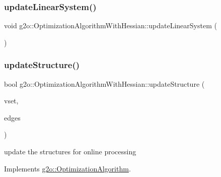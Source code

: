 \subsubsection{\texorpdfstring{update\+Linear\+System()}{updateLinearSystem()}}
{\footnotesize\ttfamily void g2o\+::\+Optimization\+Algorithm\+With\+Hessian\+::update\+Linear\+System (\begin{DoxyParamCaption}{ }\end{DoxyParamCaption})\hspace{0.3cm}{\ttfamily [virtual]}}

\mbox{\label{classg2o_1_1_optimization_algorithm_with_hessian_adadb23f135e037ce760f4415a0f26269}} 
\subsubsection{\texorpdfstring{update\+Structure()}{updateStructure()}}
{\footnotesize\ttfamily bool g2o\+::\+Optimization\+Algorithm\+With\+Hessian\+::update\+Structure (\begin{DoxyParamCaption}\item[{const std\+::vector$<$ \mbox{\hyperlink{classg2o_1_1_hyper_graph_1_1_vertex}{Hyper\+Graph\+::\+Vertex}} $\ast$$>$ \&}]{vset,  }\item[{const \mbox{\hyperlink{classg2o_1_1_hyper_graph_a5e2970e236c0dcb4eff7c205d7b6b4ae}{Hyper\+Graph\+::\+Edge\+Set}} \&}]{edges }\end{DoxyParamCaption})\hspace{0.3cm}{\ttfamily [virtual]}}

update the structures for online processing 

Implements \mbox{\hyperlink{classg2o_1_1_optimization_algorithm_a350d9bb4ee701e40b75e67d26293a4bd}{g2o\+::\+Optimization\+Algorithm}}.

\mbox{\label{classg2o_1_1_optimization_algorithm_with_hessian_aee8fc3dadc8bfbd50409f2e9940cbebd}} 
